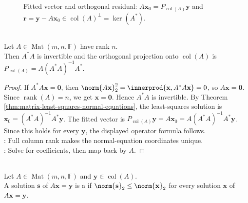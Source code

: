 \begin{figure}[H]
  \centering
  
  \caption{Fitted vector and orthogonal residual: $A\mathbf{x}_0=P_{\operatorname{col}(A)}\mathbf{y}$ and $\mathbf{r}=\mathbf{y}-A\mathbf{x}_0\in\operatorname{col}(A)^{\perp}=\ker(A^*)$.}
  \label{fig:least-squares-column-projection}
\end{figure}

\begin{corollary} \label{cor:full-column-rank-projection-formula} \\
Let $A\in\operatorname{Mat}(m,n,\mathbb{F})$ have rank $n$.\\
Then $A^*A$ is invertible and the orthogonal projection onto $\operatorname{col}(A)$ is $P_{\operatorname{col}(A)}=A(A^*A)^{-1}A^*$.
\begin{proof}
If $A^*A\mathbf{x}=\mathbf{0}$, then $\norm{A\mathbf{x}}_2^2=\innerprod{\mathbf{x},A^*A\mathbf{x}}=0$, so $A\mathbf{x}=\mathbf{0}$.\\
Since $\operatorname{rank}(A)=n$, we get $\mathbf{x}=\mathbf{0}$. Hence $A^*A$ is invertible. By Theorem \ref{thm:matrix-least-squares-normal-equations}, the least-squares solution is $\mathbf{x}_0=(A^*A)^{-1}A^*\mathbf{y}$. The fitted vector is $P_{\operatorname{col}(A)}\mathbf{y}=A\mathbf{x}_0=A(A^*A)^{-1}A^*\mathbf{y}$.\\
Since this holds for every $\mathbf{y}$, the displayed operator formula follows.\\
: Full column rank makes the normal-equation coordinates unique.\\
: Solve for coefficients, then map back by $A$.
\end{proof}
\end{corollary}

\begin{definition} \label{def:minimum-norm-solution} \\
Let $A\in\operatorname{Mat}(m,n,\mathbb{F})$ and $\mathbf{y}\in\operatorname{col}(A)$.\\
A solution $\mathbf{s}$ of $A\mathbf{x}=\mathbf{y}$ is a  if $\norm{\mathbf{s}}_2\leq\norm{\mathbf{x}}_2$ for every solution $\mathbf{x}$ of $A\mathbf{x}=\mathbf{y}$.
\end{definition}

